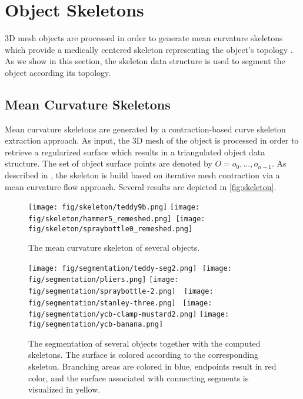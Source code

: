\section{Object Skeletons}
\label{sec-object-skeleton}

3D mesh objects are processed in order to generate mean curvature skeletons which provide a medically centered skeleton representing the object's topology \cite{tagliasacchi2012mean}. As we show in this section, the skeleton data structure is used to segment the object according its topology. 

\subsection{Mean Curvature Skeletons}
\label{sec-skeleton}

Mean curvature skeletons are generated by a contraction-based curve skeleton extraction approach. As input, the 3D mesh of the object is processed in order to retrieve a regularized surface which results in a triangulated object data structure. The set of object surface points are denoted by $O={o_0, \ldots, o_{n-1}}$.
As described in \cite{tagliasacchi2012mean}, the skeleton is build based on iterative mesh contraction via a mean curvature flow approach. Several results are depicted in \autoref{fig:skeleton}.
\begin{figure}[tbh]%
\centering
\texttt{[image: fig/skeleton/teddy9b.png]}%
\texttt{[image: fig/skeleton/hammer5\_remeshed.png]}\,%
\texttt{[image: fig/skeleton/spraybottle0\_remeshed.png]}%
\caption{The mean curvature skeleton of several objects.}%
\label{fig:skeleton}%
\end{figure}

\begin{figure*}[t]%
\centering
\texttt{[image: fig/segmentation/teddy-seg2.png]}\,\,%
\texttt{[image: fig/segmentation/pliers.png]}%
\texttt{[image: fig/segmentation/spraybottle-2.png]}\,\,\,\,%
\texttt{[image: fig/segmentation/stanley-three.png]}\,\,\,%
\texttt{[image: fig/segmentation/ycb-clamp-mustard2.png]}%
\texttt{[image: fig/segmentation/ycb-banana.png]}%
\caption{The segmentation of several objects together with the computed skeletons. The surface is colored according to the corresponding skeleton. Branching areas are colored in blue, endpoints result in red color, and the surface associated with connecting segments is visualized in yellow.}%
\label{fig:segmentation}%
\end{figure*}

